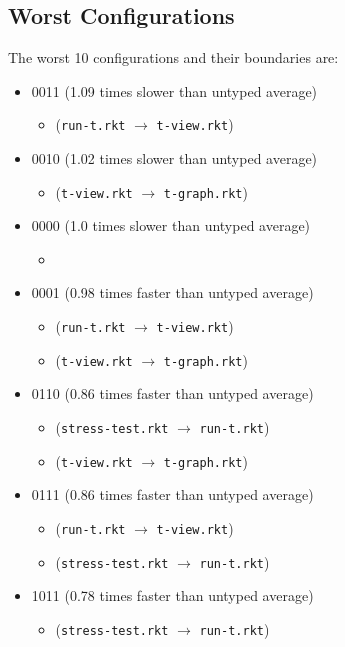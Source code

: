 \documentclass{article}
\newcommand{\mono}[1]{\texttt{#1}}
\begin{document}
\subsection{Worst Configurations}
The worst 10 configurations and their boundaries are:
\begin{itemize}
\item 0011 (1.09 times slower than untyped average)
  \begin{itemize}
  \item (\mono{run-t.rkt} $\rightarrow$ \mono{t-view.rkt})
  \end{itemize}
\item 0010 (1.02 times slower than untyped average)
  \begin{itemize}
  \item (\mono{t-view.rkt} $\rightarrow$ \mono{t-graph.rkt})
  \end{itemize}
\item 0000 (1.0 times slower than untyped average)
  \begin{itemize}
  \item 
  \end{itemize}
\item 0001 (0.98 times faster than untyped average)
  \begin{itemize}
  \item (\mono{run-t.rkt} $\rightarrow$ \mono{t-view.rkt})
  \item (\mono{t-view.rkt} $\rightarrow$ \mono{t-graph.rkt})
  \end{itemize}
\item 0110 (0.86 times faster than untyped average)
  \begin{itemize}
  \item (\mono{stress-test.rkt} $\rightarrow$ \mono{run-t.rkt})
  \item (\mono{t-view.rkt} $\rightarrow$ \mono{t-graph.rkt})
  \end{itemize}
\item 0111 (0.86 times faster than untyped average)
  \begin{itemize}
  \item (\mono{run-t.rkt} $\rightarrow$ \mono{t-view.rkt})
  \item (\mono{stress-test.rkt} $\rightarrow$ \mono{run-t.rkt})
  \end{itemize}
\item 1011 (0.78 times faster than untyped average)
  \begin{itemize}
  \item (\mono{stress-test.rkt} $\rightarrow$ \mono{run-t.rkt})

\end{itemize}
\end{itemize}
\end{document}
